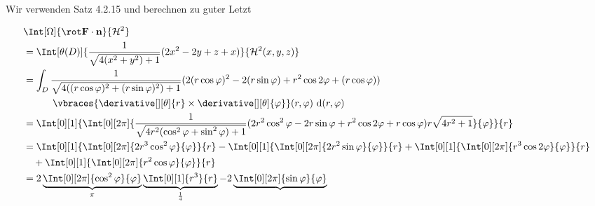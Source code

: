 \begin{solution}
\begin{enumerate}[label = \arabic*.]
    Wir verwenden Satz 4.2.15 und berechnen zu guter Letzt

    \begin{align*}
        &
        \Int[\Omega]
        {
            \rot \mathbf F \cdot \mathbf n
        }{
            \mathcal H^2
        } \\
        & =
        \Int[\theta(D)]
        {
            \frac{1}{\sqrt{4 (x^2 + y^2) + 1}}
            (2 x^2 - 2 y + z + x)
        }{
            \mathcal H^2(x, y, z)
        } \\
        & =
        \int_D
            \frac{1}{\sqrt{4 ((r \cos \varphi)^2 + (r \sin \varphi)^2) + 1}}
            (2 (r \cos \varphi)^2 - 2 (r \sin \varphi) + r^2 \cos{2 \varphi} + (r \cos \varphi)) \\
        & \quad \quad \quad
            \vbraces
            {
                \derivative[][\theta]{r}
                \times
                \derivative[][\theta]{\varphi}
            }(r, \varphi)
            ~\mathrm d(r, \varphi) \\
        & =
        \Int[0][1]
        {
            \Int[0][2 \pi]
            {
                \frac{1}{\sqrt{4 r^2 (\cos^2 \varphi + \sin^2 \varphi) + 1}}
                (2 r^2 \cos^2 \varphi - 2 r \sin \varphi + r^2 \cos{2 \varphi} + r \cos \varphi)
                r
                \sqrt{4 r^2 + 1}
            }{\varphi}
        }{r} \\
        & =
        \Int[0][1]
        {
            \Int[0][2 \pi]
            {
                2 r^3 \cos^2 \varphi
            }{\varphi}
        }{r}
        -
        \Int[0][1]
        {
            \Int[0][2 \pi]
            {
                2 r^2 \sin \varphi
            }{\varphi}
        }{r}
        +
        \Int[0][1]
        {
            \Int[0][2 \pi]
            {
                r^3 \cos{2 \varphi}
            }{\varphi}
        }{r} \\
        & \quad
        +
        \Int[0][1]
        {
            \Int[0][2 \pi]
            {
                r^2 \cos \varphi
            }{\varphi}
        }{r} \\
        & =
        2
        \underbrace
        {
            \Int[0][2 \pi]
            {
                \cos^2 \varphi
            }{\varphi}
        }_\pi
        \underbrace
        {
            \Int[0][1]
            {
                r^3
            }{r}
        }_\frac{1}{4}
        -
        2
        \underbrace
        {
            \Int[0][2 \pi]
            {
                \sin \varphi
            }{\varphi}
}
\end{align*}
\end{enumerate}
\end{solution}
